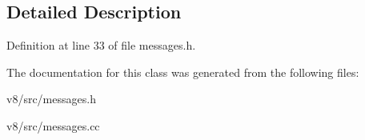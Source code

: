 \subsection{Detailed Description}


Definition at line 33 of file messages.\+h.



The documentation for this class was generated from the following files\+:\begin{DoxyCompactItemize}
\item 
v8/src/messages.\+h\item 
v8/src/messages.\+cc\end{DoxyCompactItemize}
